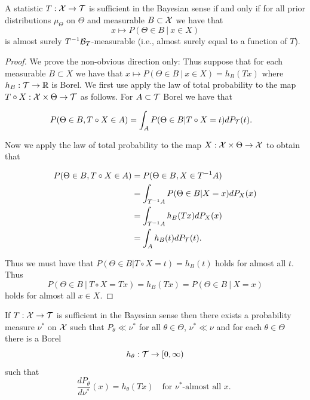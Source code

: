 \documentclass[twoside, a4paper, 10pt]{amsart}
\begin{document}
\begin{lemma} A statistic $T:\mathcal{X} \to \mathcal{T}$ is sufficient in the Bayesian sense if and only if for all prior distributions $\mu_{\Theta}$ on $\Theta$ and measurable $B \subset \mathcal{X}$ we have that $$x \mapsto P(\Theta \in B ~|~ x \in X)$$ is almost surely $T^{-1}\mathcal{B}_T$-measurable (i.e., almost surely equal to a function of $T$).

\end{lemma}

\begin{proof} We prove the non-obvious direction only: Thus suppose that for each measurable $B \subset X$ we have that $x\mapsto P(\Theta \in B ~|~ x \in X) = h_B(Tx)$ where $h_B: \mathcal{T} \to \mathbb{R}$ is Borel. We first use apply the law of total probability to the map $T\circ X:\mathcal{X} \times \Theta \to \mathcal{T}$ as follows. For $A \subset \mathcal{T}$ Borel we have that

\begin{align*} P(\Theta \in B, T\circ X \in A) &= \int_{A} P(\Theta \in B| T\circ X = t) dP_{\mathcal{T}}(t).\end{align*} 

Now we apply the law of total probability to the map $X:\mathcal{X} \times \Theta \to \mathcal{X}$ to obtain that 

\begin{align*} P(\Theta \in B, T\circ X \in A) &= P(\Theta \in B , X \in T^{-1}A) \\
&= \int_{T^{-1}A} P(\Theta \in B | X = x)dP_X(x) \\ 
&= \int_{T^{-1}A} h_B(Tx) dP_X(x) \\
&= \int_A h_B(t) dP_{\mathcal{T}}(t).\end{align*} 

Thus we must have that $P(\Theta \in B | T \circ X = t) = h_B(t)$ holds for almost all $t$. Thus $$P(\Theta \in B ~|~ T \circ X = Tx) = h_B(Tx) = P(\Theta \in B ~|~ X = x)$$ holds for almost all $x \in X$. \end{proof}

\begin{lemma} \label{lemma: construction nu*} If $T:\mathcal{X} \to \mathcal{T}$ is sufficient in the Bayesian sense then there exists a probability measure $\nu^*$ on $\mathcal{X}$ such that $P_{\theta} \ll \nu^*$ for all $\theta \in \Theta$, $\nu^* \ll \nu$ and for each $\theta \in \Theta$ there is a Borel $$h_{\theta}:\mathcal{T} \to [0,\infty)$$ such that $$\frac{dP_{\theta}}{d\nu^*}(x) = h_{\theta}(Tx) \quad\text{for $\nu^*$-almost all $x$. }$$

\end{lemma}
\end{document}
